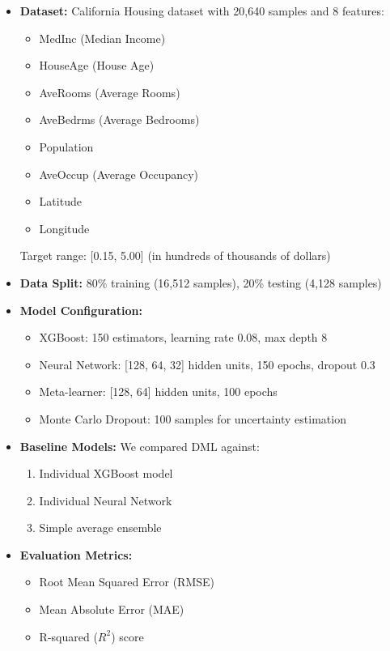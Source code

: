 \documentclass[10pt,journal,compsoc]{IEEEtran}
\begin{document}
\begin{itemize}
    \item \textbf{Dataset:} California Housing dataset with 20,640 samples and 8 features:
    \begin{itemize}
        \item MedInc (Median Income)
        \item HouseAge (House Age)
        \item AveRooms (Average Rooms)
        \item AveBedrms (Average Bedrooms)
        \item Population
        \item AveOccup (Average Occupancy)
        \item Latitude
        \item Longitude
    \end{itemize}
    Target range: [0.15, 5.00] (in hundreds of thousands of dollars)

    \item \textbf{Data Split:} 80\% training (16,512 samples), 20\% testing (4,128 samples)
    
    \item \textbf{Model Configuration:}
    \begin{itemize}
        \item XGBoost: 150 estimators, learning rate 0.08, max depth 8
        \item Neural Network: [128, 64, 32] hidden units, 150 epochs, dropout 0.3
        \item Meta-learner: [128, 64] hidden units, 100 epochs
        \item Monte Carlo Dropout: 100 samples for uncertainty estimation
    \end{itemize}

    \item \textbf{Baseline Models:} We compared DML against:
    \begin{enumerate}
        \item Individual XGBoost model
        \item Individual Neural Network
        \item Simple average ensemble
    \end{enumerate}

    \item \textbf{Evaluation Metrics:} 
    \begin{itemize}
        \item Root Mean Squared Error (RMSE)
        \item Mean Absolute Error (MAE)
        \item R-squared ($R^2$) score
    \end{itemize}
\end{itemize}
\end{document}
